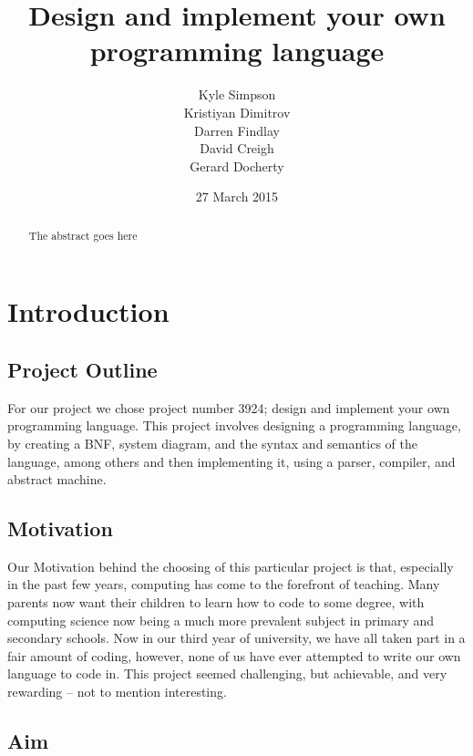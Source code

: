 \documentclass{l3proj}
\begin{document}
\title{Design and implement your own programming language}
\author{Kyle Simpson\\
		Kristiyan Dimitrov\\
		Darren Findlay\\
		David Creigh\\
		Gerard Docherty}
\date{27 March 2015}
\maketitle
\begin{abstract}

The abstract goes here

\end{abstract}
\educationalconsent
\tableofcontents
\chapter{Introduction}
\label{intro}

\section{Project Outline}

For our project we chose project number 3924; design and implement your own programming language. This project involves designing a programming language, by creating a BNF, system diagram, and the syntax and semantics of the language, among others and then implementing it, using a parser, compiler, and abstract machine.

\section{Motivation}

Our Motivation behind the choosing of this particular project is that, especially in the past few years, computing has come to the forefront of teaching. Many parents now want their children to learn how to code to some degree, with computing science now being a much more prevalent subject in primary and secondary schools. Now in our third year of university, we have all taken part in a fair amount of coding, however, none of us have ever attempted to write our own language to code in. This project seemed challenging, but achievable, and very rewarding – not to mention interesting.

\section{Aim}
\end{document}
